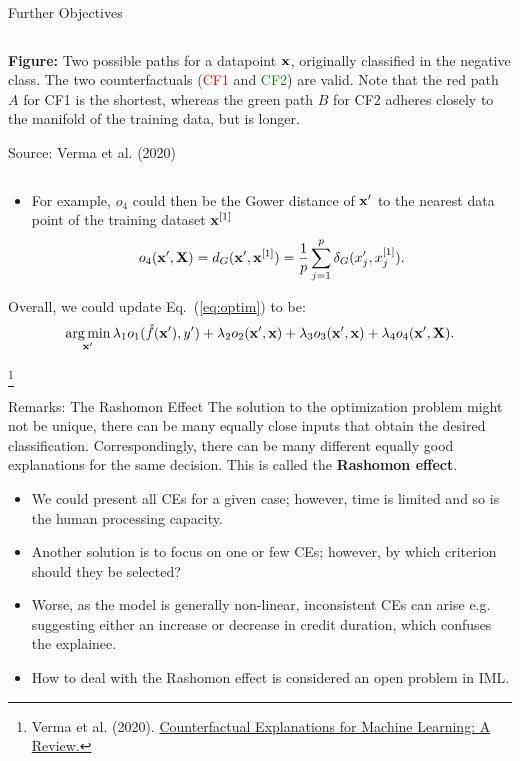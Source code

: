 \documentclass[11pt,compress,t,notes=noshow, aspectratio=169, xcolor=table]{beamer}
\begin{document}
\begin{vbframe}[allowframebreaks]{Further Objectives}
\begin{columns}
\begin{column}{0.4\textwidth}
		\scriptsize{\textbf{Figure:} Two possible paths for a datapoint \textcolor{blue}{$\mathbf{x}$},
			originally classified in the negative class. The two counterfactuals (\textcolor{red}{CF1} and \textcolor{green}{CF2}) are valid. Note that the red path $A$ for CF1 is the shortest, whereas the
			green path $B$ for CF2 adheres closely to the manifold of the training data, but is longer.}
		\vspace{0.3cm}
		
		\tiny{Source: Verma et al. (2020)}
		
		\vspace{0.3cm}
	\end{column}
	\end{columns}
	\begin{itemize}
		\item For example, $o_4$ could then be the Gower distance of $\mathbf{x}'$ to the nearest data point of the training dataset $\mathbf{x}^{[1]}$
	$$o_4(\mathbf{x}', \mathbf{X}) = d_G(\mathbf{x}', \mathbf{x}^{[1]}) = \frac{1}{p} \sum_{j = 1}^{p}  \delta_G(x_j', x^{[1]}_j).$$
		\end{itemize}
	
	Overall, we could update Eq.~(\ref{eq:optim}) to be: 
	\begin{equation}
		\mathop{\mathrm{arg\,min}}_{\mathbf{x}'} \lambda_1 o_1(\hat{f}(\mathbf{x}'), y') + \lambda_2 o_2(\mathbf{x}', \mathbf{x}) + \lambda_3 o_3(\mathbf{x}', \mathbf{x}) + \lambda_4 o_4(\mathbf{x}', \mathbf{X}).
	\end{equation}


\footnote[frame]{Verma et al. (2020). \href{https://arxiv.org/pdf/2010.10596.pdf}{Counterfactual Explanations for Machine Learning: A Review.}}

\end{vbframe}

\begin{vbframe}{Remarks: The Rashomon Effect}
The solution to the optimization problem might not be unique, there can be many equally close inputs that obtain the desired classification. Correspondingly, there can be many different equally good explanations for the same decision. This is called the \textbf{Rashomon effect}.
	\begin{itemize}
		\item We could present all CEs for a given case; however, time is limited and so is the human processing capacity.
		\item Another solution is to focus on one or few CEs; however, by which criterion should they be selected?
		\item Worse, as the model is generally non-linear, inconsistent CEs can arise e.g. suggesting either an increase or decrease in credit duration, which confuses the explainee.
		\item How to deal with the Rashomon effect is considered an open problem in IML.
	\end{itemize}
\end{vbframe}
\end{document}
